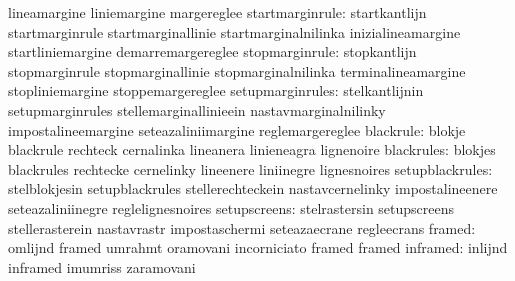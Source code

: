                                   lineamargine                     liniemargine
                                  margereglee
                 startmarginrule: startkantlijn                    startmarginrule
                                  startmarginallinie               startmarginalnilinka
                                  inizialineamargine               startliniemargine
                                  demarremargereglee
                  stopmarginrule: stopkantlijn                     stopmarginrule
                                  stopmarginallinie                stopmarginalnilinka
                                  terminalineamargine              stopliniemargine
                                  stoppemargereglee
                setupmarginrules: stelkantlijnin                   setupmarginrules
                                  stellemarginallinieein           nastavmarginalnilinky
                                  impostalineemargine              seteazaliniimargine
                                  reglemargereglee
                       blackrule: blokje                           blackrule
                                  rechteck                         cernalinka
                                  lineanera                        linieneagra
                                  lignenoire
                      blackrules: blokjes                          blackrules
                                  rechtecke                        cernelinky
                                  lineenere                        liniinegre
                                  lignesnoires
                 setupblackrules: stelblokjesin                    setupblackrules
                                  stellerechteckein                nastavcernelinky
                                  impostalineenere                 seteazaliniinegre
                                  reglelignesnoires
                    setupscreens: stelrastersin                    setupscreens
                                  stellerasterein                  nastavrastr
                                  impostaschermi                   seteazaecrane
                                  regleecrans
                          framed: omlijnd                          framed
                                  umrahmt                          oramovani
                                  incorniciato                     framed
                                  framed
                        inframed: inlijnd                          inframed
                                  imumriss                         zaramovani
